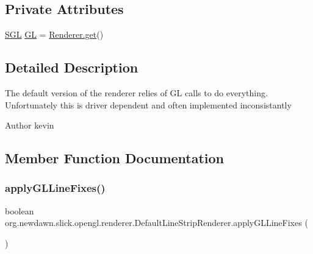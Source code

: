 \subsection*{Private Attributes}
\begin{DoxyCompactItemize}
\item 
\mbox{\hyperlink{interfaceorg_1_1newdawn_1_1slick_1_1opengl_1_1renderer_1_1_s_g_l}{S\+GL}} \mbox{\hyperlink{classorg_1_1newdawn_1_1slick_1_1opengl_1_1renderer_1_1_default_line_strip_renderer_a8c4f5b0df77bf3a446d9d570f26e4171}{GL}} = \mbox{\hyperlink{classorg_1_1newdawn_1_1slick_1_1opengl_1_1renderer_1_1_renderer_abe742c3a7dfca67c6c01821d27087308}{Renderer.\+get}}()
\end{DoxyCompactItemize}


\subsection{Detailed Description}
The default version of the renderer relies of GL calls to do everything. Unfortunately this is driver dependent and often implemented inconsistantly

\begin{DoxyAuthor}{Author}
kevin 
\end{DoxyAuthor}


\subsection{Member Function Documentation}
\mbox{\label{classorg_1_1newdawn_1_1slick_1_1opengl_1_1renderer_1_1_default_line_strip_renderer_ab8658df4f3b6dfae473b3c708dadfdfb}} 
\subsubsection{\texorpdfstring{apply\+G\+L\+Line\+Fixes()}{applyGLLineFixes()}}
{\footnotesize\ttfamily boolean org.\+newdawn.\+slick.\+opengl.\+renderer.\+Default\+Line\+Strip\+Renderer.\+apply\+G\+L\+Line\+Fixes (\begin{DoxyParamCaption}{ }\end{DoxyParamCaption})\hspace{0.3cm}{\ttfamily [inline]}}

